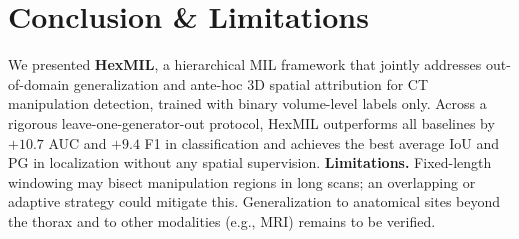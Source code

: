 \documentclass[sigconf, screen, review, anonymous]{acmart}
\begin{document}
\section{Conclusion \& Limitations}
\label{sec:conclusion}
We presented \textbf{HexMIL}, a hierarchical MIL framework that jointly addresses out-of-domain generalization and ante-hoc 3D spatial attribution for CT manipulation detection, trained with binary volume-level labels only. Across a rigorous leave-one-generator-out protocol, HexMIL outperforms all baselines by $+10.7$ AUC and $+9.4$ F1 in classification and achieves the best average IoU and PG in localization without any spatial supervision.
\textbf{Limitations.} Fixed-length windowing may bisect manipulation regions in long scans; an overlapping or adaptive strategy could mitigate this. Generalization to anatomical sites beyond the thorax and to other modalities (e.g., MRI) remains to be verified.




\begin{acks}

\end{acks}






\end{document}
